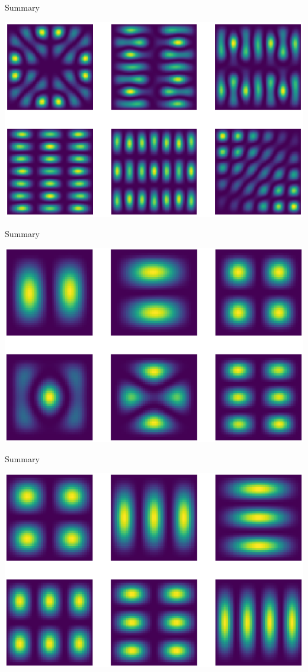 \documentclass[mathserif]{beamer}
\begin{document}
\begin{frame}{Summary}

 \centering
 \includegraphics[scale=0.7]{images/what.eps}

\end{frame}

\begin{frame}{Summary}

 \centering
 \includegraphics[scale=0.45]{images/what1.eps}

\end{frame}

\begin{frame}{Summary}

 \centering
 \includegraphics[scale=0.45]{images/correct3.eps}

\end{frame}
\end{document}
